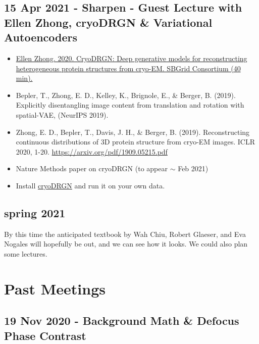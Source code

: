 \documentclass[11pt, oneside]{article}   	%
\begin{document}
\subsection{15 Apr 2021 - Sharpen - Guest Lecture with Ellen Zhong, cryoDRGN \& Variational Autoencoders}
\begin{itemize}
	\item \href{https://youtu.be/yft_qhErStg}{Ellen Zhong. 2020. CryoDRGN: Deep generative models for reconstructing heterogeneous protein structures from cryo-EM. SBGrid Consortium (40 min).}
	\item Bepler, T., Zhong, E. D., Kelley, K., Brignole, E., \& Berger, B. (2019). Explicitly disentangling image content from translation and rotation with spatial-VAE, (NeurIPS 2019).
	\item Zhong, E. D., Bepler, T., Davis, J. H., \& Berger, B. (2019). Reconstructing continuous distributions of 3D protein structure from cryo-EM images. ICLR 2020, 1-20. \url{https://arxiv.org/pdf/1909.05215.pdf}
	\item Nature Methods paper on cryoDRGN (to appear $\sim$ Feb 2021)
\end{itemize}
\begin{itemize}
	\item Install \href{https://github.com/zhonge/cryodrgn}{cryoDRGN} and run it on your own data.
\end{itemize}


\pagebreak
\subsection{spring 2021}
By this time the anticipated textbook by Wah Chiu, Robert Glaeser, and Eva Nogales will hopefully be out, and we can see how it looks. We could also plan some lectures.

\pagebreak
\section{Past Meetings}


\subsection{19 Nov 2020 - Background Math \& Defocus Phase Contrast}
\end{document}
